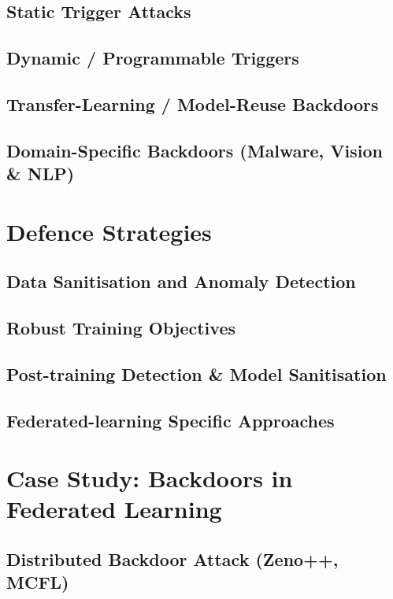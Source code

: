 \documentclass[sigconf,authorversion,nonacm,balance=false]{acmart}
\begin{document}
\subsection{Static Trigger Attacks}\label{sec:static}
\subsection{Dynamic / Programmable Triggers}\label{sec:dynamic}
\subsection{Transfer-Learning / Model-Reuse Backdoors}\label{sec:reuse}
\subsection{Domain-Specific Backdoors (Malware, Vision \& NLP)}\label{sec:domain}

\section{Defence Strategies}\label{sec:defence}
\subsection{Data Sanitisation and Anomaly Detection}
\subsection{Robust Training Objectives}
\subsection{Post-training Detection \& Model Sanitisation}
\subsection{Federated-learning Specific Approaches}

\section{Case Study: Backdoors in Federated Learning}\label{sec:fl}
\subsection{Distributed Backdoor Attack (Zeno++, MCFL)}
\end{document}

